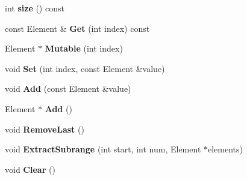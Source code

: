\begin{DoxyCompactItemize}
\mbox{\label{classgoogle_1_1protobuf_1_1RepeatedField_a31faaa92327fa8b29b23d3a9112e64e4}} 
int {\bfseries size} () const
\item 
\mbox{\label{classgoogle_1_1protobuf_1_1RepeatedField_a3fe5d6543057863104369720ad2e5684}} 
const Element \& {\bfseries Get} (int index) const
\item 
\mbox{\label{classgoogle_1_1protobuf_1_1RepeatedField_a9096cd0254365aa2cc3287f07f863bfe}} 
Element $\ast$ {\bfseries Mutable} (int index)
\item 
\mbox{\label{classgoogle_1_1protobuf_1_1RepeatedField_ad2d35e8a881346740cb4bd8dcc4a9747}} 
void {\bfseries Set} (int index, const Element \&value)
\item 
\mbox{\label{classgoogle_1_1protobuf_1_1RepeatedField_af1a3a8dc717c66ed746795ee3b80d42e}} 
void {\bfseries Add} (const Element \&value)
\item 
\mbox{\label{classgoogle_1_1protobuf_1_1RepeatedField_a6f9a0071f45cc1b9d1d00b4ec625f8c8}} 
Element $\ast$ {\bfseries Add} ()
\item 
\mbox{\label{classgoogle_1_1protobuf_1_1RepeatedField_a3cf9e42bf09efc05b1ac1c228dc080fb}} 
void {\bfseries Remove\+Last} ()
\item 
\mbox{\label{classgoogle_1_1protobuf_1_1RepeatedField_a18be896cba399d287867dc37c648b544}} 
void {\bfseries Extract\+Subrange} (int start, int num, Element $\ast$elements)
\item 
\mbox{\label{classgoogle_1_1protobuf_1_1RepeatedField_a445b2f9a9c96e985f81a122ddf764b6b}} 
void {\bfseries Clear} ()
\item 
\mbox{\label{classgoogle_1_1protobuf_1_1RepeatedField_a2f2de1d26c3732724005274cd1af5985}} 

\end{DoxyCompactItemize}
